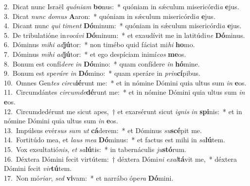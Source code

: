 {2.~}Dicat nunc Israël \textit{quó}\textit{ni}\textit{am} \textbf{bo}nus:~* quóniam in sǽculum misericórdi\textit{a} \textbf{e}jus.\\
{3.~}Dicat \textit{nunc} \textit{do}\textit{mus} \textbf{A}aron:~* quóniam in sǽculum misericórdi\textit{a} \textbf{e}jus.\\
{4.~}Dicant nunc \textit{qui} \textit{ti}\textit{ment} \textbf{Dó}minum:~* quóniam in sǽculum misericórdi\textit{a} \textbf{e}jus.\\
{5.~}De tribulatióne in\textit{vo}\textit{cá}\textit{vi} \textbf{Dó}minum:~* et exaudívit me in latitúdi\textit{ne} \textbf{Dó}minus.\\
{6.~}Dóminus \textit{mi}\textit{hi} \textit{ad}\textbf{jú}tor:~* non timébo quid fáciat mi\textit{hi} \textbf{ho}mo.\\
{7.~}Dóminus \textit{mi}\textit{hi} \textit{ad}\textbf{jú}tor:~* et ego despíciam inimí\textit{cos} \textbf{me}os.\\
{8.~}Bonum est confí\textit{de}\textit{re} \textit{in} \textbf{Dó}mino:~* quam confídere \textit{in} \textbf{hó}mine.\\
{9.~}Bonum est spe\textit{rá}\textit{re} \textit{in} \textbf{Dó}mino:~* quam speráre in \textit{prin}\textbf{cí}pibus.\\
{10.~}Omnes Gen\textit{tes} \textit{cir}\textit{cu}\textbf{ié}runt me:~* et in nómine Dómini quia ultus sum \textit{in} \textbf{e}os.\\
{11.~}Circumdántes \textit{cir}\textit{cum}\textit{de}\textbf{dé}runt me:~* et in nómine Dómini quia ultus sum \textit{in} \textbf{e}os.\\
{12.~}Circumdedérunt me sicut apes,~† et exarsérunt sicut \textit{i}\textit{gnis} \textit{in} \textbf{spi}nis:~* et in nómine Dómini quia ultus sum \textit{in} \textbf{e}os.\\
{13.~}Impúlsus evér\textit{sus} \textit{sum} \textit{ut} \textbf{cá}derem:~* et Dóminus \textit{su}\textbf{scé}pit me.\\
{14.~}Fortitúdo mea, et \textit{laus} \textit{me}\textit{a} \textbf{Dó}minus:~* et factus est mihi in \textit{sa}\textbf{lú}tem.\\
{15.~}Vox exsultatió\textit{nis}, \textit{et} \textit{sa}\textbf{lú}tis:~* in tabernáculis \textit{ju}\textbf{stó}rum.\\
{16.~}Déxtera Dómini fecit virtútem:~† déxtera Dómi\textit{ni} \textit{e}\textit{xal}\textbf{tá}vit me,~* déxtera Dómini fecit \textit{vir}\textbf{tú}tem.\\
{17.~}Non mó\textit{ri}\textit{ar}, \textit{sed} \textbf{vi}vam:~* et narrábo ópe\textit{ra} \textbf{Dó}mini.\\
